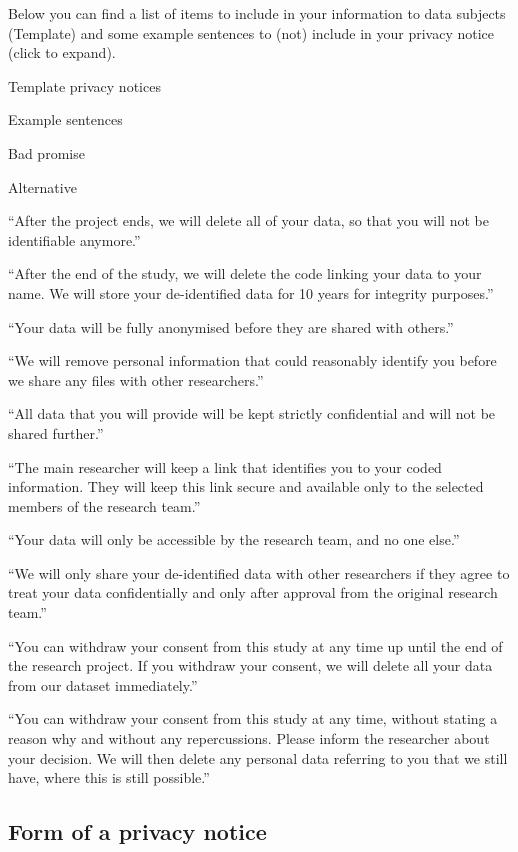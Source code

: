 \documentclass[
]{book}
\begin{document}
Below you can find a list of items to include in your information to data
subjects (Template) and some example sentences to (not) include in your privacy
notice (click to expand).

Template privacy notices

Example sentences

Bad promise

Alternative

``After the project ends, we will delete all of your data, so that you will not be identifiable anymore.''

``After the end of the study, we will delete the code linking your data to your name. We will store your de-identified data for 10 years for integrity purposes.''

``Your data will be fully anonymised before they are shared with others.''

``We will remove personal information that could reasonably identify you before we share any files with other researchers.''

``All data that you will provide will be kept strictly confidential and will not be shared further.''

``The main researcher will keep a link that identifies you to your coded information. They will keep this link secure and available only to the selected members of the research team.''

``Your data will only be accessible by the research team, and no one else.''

``We will only share your de-identified data with other researchers if they agree to treat your data confidentially and only after approval from the original research team.''

``You can withdraw your consent from this study at any time up until the end of the research project. If you withdraw your consent, we will delete all your data from our dataset immediately.''

``You can withdraw your consent from this study at any time, without stating a reason why and without any repercussions. Please inform the researcher about your decision. We will then delete any personal data referring to you that we still have, where this is still possible.''

\hypertarget{form-of-a-privacy-notice}{%
\subsection{Form of a privacy notice}\label{form-of-a-privacy-notice}}
\end{document}
